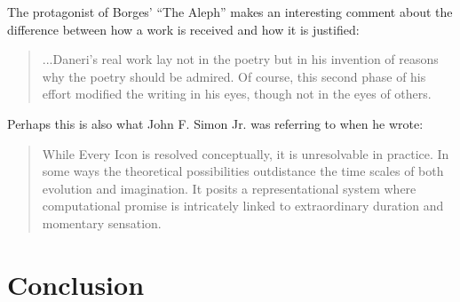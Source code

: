 \documentclass{thesis}
\begin{document}
	The protagonist of Borges' ``The Aleph'' makes an interesting comment about the difference between how a work is received and how it is justified:
	
	\begin{quote}
	...Daneri's real work lay not in the poetry but in his invention of reasons why the poetry should be admired. Of course, this second phase of his effort modified the writing in his eyes, though not in the eyes of others.
	\end{quote}
	
	Perhaps this is also what John F. Simon Jr. was referring to when he wrote:
	
	\begin{quote}
	While Every Icon is resolved conceptually, it is unresolvable in practice. In some ways the theoretical possibilities outdistance the time scales of both evolution and imagination. It posits a representational system where computational promise is intricately linked to extraordinary duration and momentary sensation.\cite{john_f._simon_jr._given:32_1997}
	\end{quote}
	
\chapter{Conclusion}

\begin{singlespace}


\end{singlespace}
\end{document}

